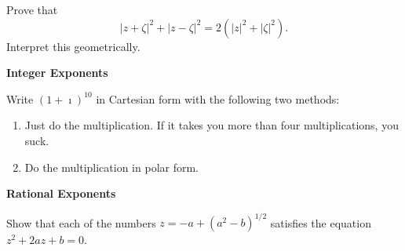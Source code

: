 {\begin{Exercise}
\end{Exercise}






\begin{Exercise}
  \label{exercise parallelogram identity}
  Prove that 
  \[
  \left| z + \zeta \right|^2 + \left| z - \zeta \right|^2
  = 2 \left( \left| z \right|^2 + \left| \zeta \right|^2 \right).
  \]
  Interpret this geometrically.

\end{Exercise}







\begin{large}
  \noindent
  \textbf{Integer Exponents}
\end{large}



\begin{Exercise}
  \label{exercise (1+i)10}
  Write $(1 + \imath)^{10}$ in Cartesian form with the following two methods:
  \begin{enumerate}
  \item
    Just do the multiplication.  If it takes you more than four 
    multiplications, you suck.
  \item
    Do the multiplication in polar form.
  \end{enumerate}

\end{Exercise}




\begin{large}
  \noindent
  \textbf{Rational Exponents}
\end{large}




\begin{Exercise}
  \label{exercise z2 + 2az + b = 0}
  Show that each of the numbers $z = - a + \left( a^2 - b \right)^{1/2}$ 
  satisfies the equation $z^2 + 2 a z + b = 0$.

\end{Exercise}




















\raggedbottom
}
